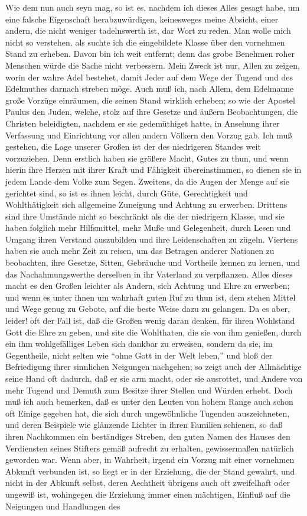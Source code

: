 Wie dem nun auch seyn mag, so ist es, nachdem ich dieses Alles gesagt habe, um eine falsche Eigenschaft herabzuwürdigen, keinesweges meine Absicht, einer andern, die nicht weniger tadelnswerth ist, dar Wort zu reden. Man wolle mich nicht so verstehen, als suchte ich die eingebildete Klasse über den vornehmen Stand zu erheben. Davon bin ich weit entfernt; denn das grobe Benehmen roher Menschen würde die Sache nicht verbessern. Mein Zweck ist nur, Allen zu zeigen, worin der wahre Adel bestehet, damit Jeder auf dem Wege der Tugend und des Edelmuthes darnach streben möge. Auch muß ich, nach Allem, dem Edelmanne große Vorzüge einräumen, die seinen Stand wirklich erheben; so wie der Apostel Paulus den Juden, welche, stolz auf ihre Gesetze und äußern Beobachtungen, die Christen beleidigten, nachdem er sie gedemüthiget hatte, in Ansehung ihrer Verfassung und Einrichtung vor allen andern Völkern den Vorzug gab. Ich muß gestehen, die Lage unserer Großen ist der des niedrigeren Standes weit vorzuziehen. Denn erstlich haben sie größere Macht, Gutes zu thun, und wenn hierin ihre Herzen mit ihrer Kraft und Fähigkeit übereinstimmen, so dienen sie in jedem Lande dem Volke zum Segen. Zweitens, da die Augen der Menge auf sie gerichtet sind, so ist es ihnen leicht, durch Güte, Gerechtigkeit und Wohlthätigkeit sich allgemeine Zuneigung und Achtung zu erwerben. Drittens sind ihre Umstände nicht so beschränkt als die der niedrigern Klasse, und sie haben folglich mehr Hilfsmittel, mehr Muße und Gelegenheit, durch Lesen und Umgang ihren Verstand auszubilden und ihre Leidenschaften zu zügeln. Viertens haben sie auch mehr Zeit zu reisen, um das Betragen anderer Nationen zu beobachten, ihre Gesetze, Sitten, Gebräuche und Vortheile kennen zu lernen, und das Nachahmungswerthe derselben in ihr Vaterland zu verpflanzen. Alles dieses macht es den Großen leichter als Andern, sich Achtung und Ehre zu erwerben; und wenn es unter ihnen um wahrhaft guten Ruf zu thun ist, dem stehen Mittel und Wege genug zu Gebote, auf die beste Weise dazu zu gelangen. Da es aber, leider! oft der Fall ist, daß die Großen wenig daran denken, für ihren Wohlstand Gott die Ehre zu geben, und site die Wohlthaten, die sie von ihm genießen, durch ein ihm wohlgefälliges Leben sich dankbar zu erweisen, sondern da sie, im Gegentheile, nicht selten wie "`ohne Gott in der Welt leben,"'  und bloß der Befriedigung ihrer sinnlichen Neigungen nachgehen; so zeigt auch der Allmächtige seine Hand oft dadurch, daß er sie arm macht, oder sie ausrottet, und Andere von mehr Tugend und Demuth zum Besitze ihrer Stellen und Würden erhebt. Doch muß ich auch bemerken, daß es unter den Leuten von hohem Range auch schon oft Einige gegeben hat, die sich durch ungewöhnliche Tugenden auszeichneten, und deren Beispiele wie glänzende Lichter in ihren Familien schienen, so daß ihren Nachkommen ein beständiges Streben, den guten Namen des Hauses den Verdiensten seines Stifters gemäß aufrecht zu erhalten, gewissermaßen natürlich geworden war. Wenn aber, in Wahrheit, irgend ein Vorzug mit einer vornehmen Abkunft verbunden ist, so liegt er in der Erziehung, die der Stand gewahrt, und nicht in der Abkunft selbst, deren Aechtheit übrigens auch oft zweifelhaft oder ungewiß ist, wohingegen die Erziehung immer einen mächtigen, Einfluß auf die Neigungen und Handlungen des 